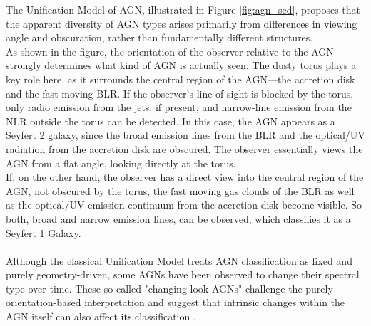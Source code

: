 The Unification Model of AGN, illustrated in Figure \ref{fig:agn_sed}, proposes that the apparent diversity of AGN types arises primarily from differences in viewing angle and obscuration, rather than fundamentally different structures.\\
As shown in the figure, the orientation of the observer relative to the AGN strongly determines what kind of AGN is actually seen. The dusty torus plays a key role here, as it surrounds the central region of the AGN—the accretion disk and the fast-moving BLR. If the observer's line of sight is blocked by the torus, only radio emission from the jets, if present, and narrow-line emission from the NLR outside the torus can be detected. In this case, the AGN appears as a Seyfert 2 galaxy, since the broad emission lines from the BLR and the optical/UV radiation from the accretion disk are obscured. The observer essentially views the AGN from a flat angle, looking directly at the torus.\\
If, on the other hand, the observer has a direct view into the central region of the AGN, not obscured by the torus, the fast moving gas clouds of the BLR as well as the optical/UV emission continuum from the accretion disk become visible. So both, broad and narrow emission lines, can be observed, which classifies it as a Seyfert 1 Galaxy. \parencite{urry1995unified}\\\\
Although the classical Unification Model treats AGN classification as fixed and purely geometry-driven, some AGNs have been observed to change their spectral type over time. These so-called "changing-look AGNs" challenge the purely orientation-based interpretation and suggest that intrinsic changes within the AGN itself can also affect its classification \parencite{ricci2022changinglook}.










